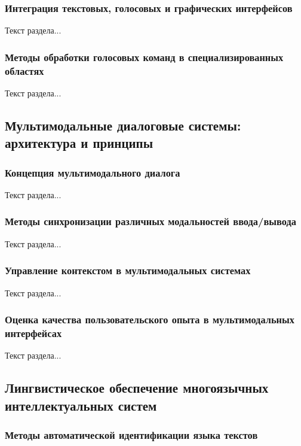 \subsubsection{Интеграция текстовых, голосовых и графических интерфейсов}

Текст раздела...

\subsubsection{Методы обработки голосовых команд в специализированных областях}

Текст раздела...

\subsection{Мультимодальные диалоговые системы: архитектура и принципы}

\subsubsection{Концепция мультимодального диалога}

Текст раздела...

\subsubsection{Методы синхронизации различных модальностей ввода/вывода}

Текст раздела...

\subsubsection{Управление контекстом в мультимодальных системах}

Текст раздела...

\subsubsection{Оценка качества пользовательского опыта в мультимодальных интерфейсах}

Текст раздела...

\subsection{Лингвистическое обеспечение многоязычных интеллектуальных систем}

\subsubsection{Методы автоматической идентификации языка текстов}

